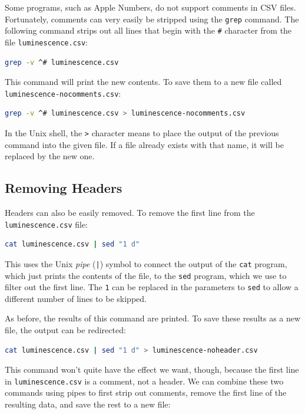 Some programs, such as Apple Numbers, do not support comments in CSV
files. Fortunately, comments can very easily be stripped using the
\lstinline!grep! command. The following command strips out all lines
that begin with the \lstinline!#! character from the file
\lstinline!luminescence.csv!:

\begin{lstlisting}[language=bash]
grep -v ^# luminescence.csv
\end{lstlisting}
This command will print the new contents. To save them to a new file
called \lstinline!luminescence-nocomments.csv!:

\begin{lstlisting}[language=bash]
grep -v ^# luminescence.csv > luminescence-nocomments.csv
\end{lstlisting}
In the Unix shell, the \lstinline!>! character means to place the output
of the previous command into the given file. If a file already exists
with that name, it will be replaced by the new one.

\subsection{Removing Headers}

Headers can also be easily removed. To remove the first line from the
\lstinline!luminescence.csv! file:

\begin{lstlisting}[language=bash]
cat luminescence.csv | sed "1 d"
\end{lstlisting}
This uses the Unix \emph{pipe} (\lstinline!|!) symbol to connect the
output of the \lstinline!cat! program, which just prints the contents of
the file, to the \lstinline!sed! program, which we use to filter out the
first line. The \lstinline!1! can be replaced in the parameters to
\lstinline!sed! to allow a different number of lines to be skipped.

As before, the results of this command are printed. To save these
results as a new file, the output can be redirected:

\begin{lstlisting}[language=bash]
cat luminescence.csv | sed "1 d" > luminescence-noheader.csv
\end{lstlisting}
This command won't quite have the effect we want, though, because the
first line in \lstinline!luminescence.csv! is a comment, not a header.
We can combine these two commands using pipes to first strip out
comments, remove the first line of the resulting data, and save the rest
to a new file:

